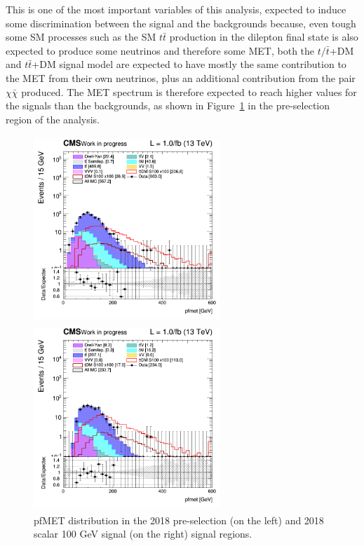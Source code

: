 \documentclass[a4paper, 10pt, openright]{report}
\begin{document}
This is one of the most important variables of this analysis, expected to induce some discrimination between the signal and the backgrounds because, even tough some \ac{SM} processes such as the \ac{SM} $t \bar t$ production in the dilepton final state is also expected to produce some neutrinos and therefore some \ac{MET}, both the $t/ \bar t$+DM and $t \bar t$+DM signal model are expected to have mostly the same contribution to the \ac{MET} from their own neutrinos, plus an additional contribution from the pair $\chi \bar \chi$ produced. The \ac{MET} spectrum is therefore expected to reach higher values for the signals than the backgrounds, as shown in Figure~\ref{fig:SRdiscMET} in the pre-selection region of the analysis.


\begin{figure}[htbp]
\centering
\begin{minipage}[b]{.47\textwidth}
\includegraphics[width=7cm, height=7cm]{figs/2018/SRBlinded-ttDM-scalar100/log_cratio_topCR_ll_METcorrected_pt.png}
\end{minipage}\hfill
\begin{minipage}[b]{.47\textwidth}
\includegraphics[width=7cm, height=7cm]{figs/2018/SRBlinded-ttDM-scalar100/log_cratio_topCR_ll_BDT_ttDM100_METcorrected_pt.png}
\end{minipage}\hfill
\caption{pf\ac{MET} distribution in the 2018 pre-selection (on the left) and 2018 scalar 100 GeV signal (on the right) signal regions.}
\label{fig:SRdiscMET}
\end{figure}
\end{document}

